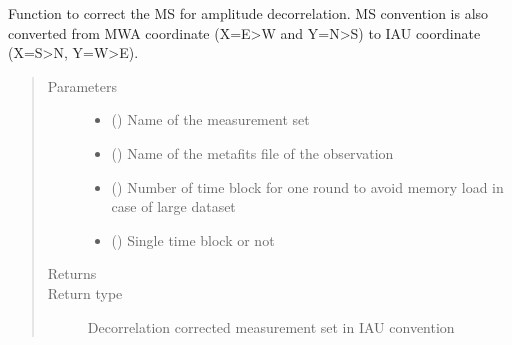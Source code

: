 \documentclass[letterpaper,10pt,english]{sphinxmanual}
\begin{document}
\begin{fulllineitems}
\label{\detokenize{paircars:paircars.decor.decor}}
\sphinxAtStartPar
Function to correct the MS for amplitude decorrelation. MS convention is also converted from MWA coordinate (X=E\sphinxhyphen{}\textgreater{}W and Y=N\sphinxhyphen{}\textgreater{}S) to IAU coordinate (X=S\sphinxhyphen{}\textgreater{}N, Y=W\sphinxhyphen{}\textgreater{}E).
\begin{quote}\begin{description}
\item[{Parameters}] \leavevmode\begin{itemize}
\item {} 
\sphinxAtStartPar
{} () \textendash{} Name of the measurement set

\item {} 
\sphinxAtStartPar
{} () \textendash{} Name of the metafits file of the observation

\item {} 
\sphinxAtStartPar
{} () \textendash{} Number of time block for one round to avoid memory load in case of large dataset

\item {} 
\sphinxAtStartPar
{} () \textendash{} Single time block or not

\end{itemize}

\item[{Returns}] \leavevmode
\sphinxAtStartPar


\item[{Return type}] \leavevmode
\sphinxAtStartPar
Decorrelation corrected measurement set in IAU convention

\end{description}\end{quote}

\end{fulllineitems}
\end{document}
